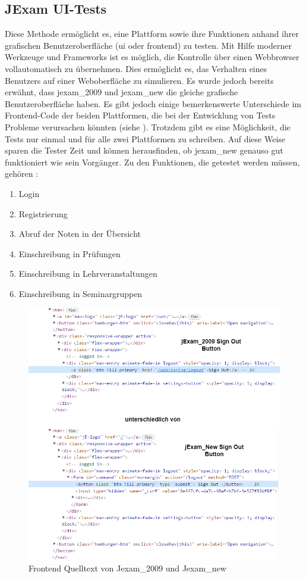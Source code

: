 \subsection{JExam UI-Tests}\label{subsec:jexam-ui-tests}

Diese Methode erm\"oglicht es, eine Plattform sowie ihre Funktionen anhand
ihrer grafischen Benutzeroberfl\"ache (\acs{ui} oder \Gls{frontend}) zu
testen. Mit Hilfe moderner Werkzeuge und Frameworks ist es m\"oglich, die
Kontrolle \"uber einen Webbrowser vollautomatisch zu \"ubernehmen. Dies
erm\"oglicht es, das Verhalten eines Benutzers auf einer Weboberfl\"ache zu
simulieren. Es wurde jedoch bereits erw\"ahnt, dass \Gls{jexam_2009} und \Gls{jexam_new}
die gleiche grafische Benutzeroberfl\"ache haben. Es gibt jedoch einige
bemerkenswerte Unterschiede im Frontend-Code der beiden Plattformen,
die bei der Entwicklung von Tests Probleme verursachen k\"onnten
(siehe ). Trotzdem gibt es eine
M\"oglichkeit, die Tests nur einmal und f\"ur alle zwei
Plattformen zu schreiben. Auf diese Weise sparen die Tester Zeit und k\"onnen
herausfinden, ob \Gls{jexam_new} genauso gut funktioniert wie sein Vorg\"anger. Zu den Funktionen, die getestet werden müssen, gehören :
\begin{enumerate}
    \item Login
    \item Registrierung
    \item Abruf der Noten in der Übersicht
    \item Einschreibung in Prüfungen
    \item Einschreibung in Lehrveranstaltungen
    \item Einschreibung in Seminargruppen
\end{enumerate}

\noindent
\begin{figure}
    \centering
    \includegraphics[scale=0.5]{images/jexam_compare}
    \caption{Frontend Quelltext von Jexam\_2009 und Jexam\_new} \label{fig:old_new}
\end{figure}

